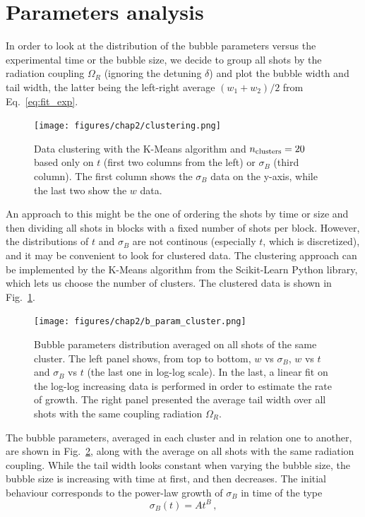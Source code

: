 \section{Parameters analysis}
\label{sec:params}
In order to look at the distribution of the bubble parameters versus the experimental time or the bubble size, we decide to group all shots by the radiation coupling $\Omega_R$ (ignoring the detuning $\delta$) and plot the bubble width and tail width, the latter being the left-right average $(w_1+w_2)/2$ from Eq.\ \eqref{eq:fit_exp}. 
\begin{figure}[h!]
    \centering
    \texttt{[image: figures/chap2/clustering.png]}
    \caption{Data clustering with the K-Means algorithm and $n_{\rm clusters} = 20$ based only on $t$ (first two columns from the left) or $\sigma_B$ (third column). The first column shows the $\sigma_B$ data on the y-axis, while the last two show the $w$ data.}
    \label{fig:clust}
\end{figure} 
An approach to this might be the one of ordering the shots by time or size and then dividing all shots in blocks with a fixed number of shots per block. However, the distributions of $t$ and $\sigma_B$ are not continous (especially $t$, which is discretized), and it may be convenient to look for clustered data. 
The clustering approach can be implemented by the K-Means algorithm from the Scikit-Learn Python library, which lets us choose the number of clusters. The clustered data is shown in Fig.\ \ref{fig:clust}. 
\begin{figure}[h!]
    \centering
    \texttt{[image: figures/chap2/b\_param\_cluster.png]}
    \caption{Bubble parameters distribution averaged on all shots of the same cluster. The left panel shows, from top to bottom, $w$ vs $\sigma_B$, $w$ vs $t$ and $\sigma_B$ vs $t$ (the last one in log-log scale). In the last, a linear fit on the log-log increasing data is performed in order to estimate the rate of growth. The right panel presented the average tail width over all shots with the same coupling radiation $\Omega_R$.}
    \label{fig:b_param}
\end{figure}
The bubble parameters, averaged in each cluster and in relation one to another, are shown in Fig.\ \ref{fig:b_param}, along with the average on all shots with the same radiation coupling. While the tail width looks constant when varying the bubble size, the bubble size is increasing with time at first, and then decreases. The initial behaviour corresponds to the power-law growth of $\sigma_B$ in time of the type
\[
    \sigma_B(t) = At^B\, , 
\]
